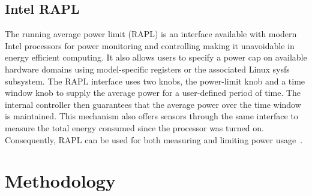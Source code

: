 \subsection{Intel RAPL} \label{subsec:RAPL} The running average power limit (RAPL) is an interface available with modern Intel processors for power monitoring and controlling making it unavoidable in energy efficient computing. It also allows users to specify a power cap on available hardware domains using model-specific registers or the associated Linux sysfs subsystem. 
The RAPL interface uses two knobs, the power-limit knob and a time window knob to supply the average power for a user-defined period of time. The internal controller then guarantees that the average power over the time window is maintained. This mechanism also offers sensors through the same interface to measure the total energy consumed since the processor was turned on. Consequently, RAPL can be used for both measuring and limiting power usage~\cite{rountree2012beyond}.



\section{Methodology}\label{sec:Methodology}

